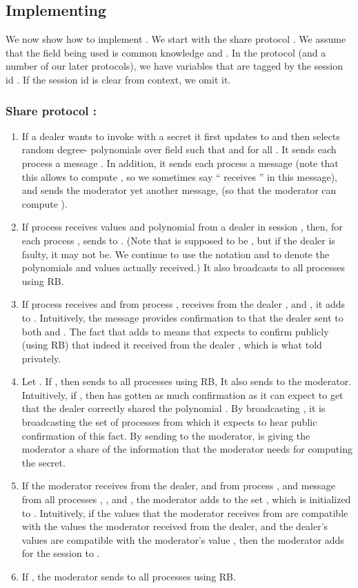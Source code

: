 \documentclass{sig-alternate}
\newcommand{\mwdavss}{\text{MW-SVSS}\xspace}
\begin{document}
\subsection{Implementing \mwdavss}
We now show how to implement \mwdavss.  We start with the
share protocol .  We assume that the field  being used is
common knowledge and .
In the  protocol (and a number of our later protocols), we
have variables that are tagged by the session id .  If the
session id is clear from context, we omit it.

\subsubsection*{Share protocol :}
\begin{enumerate}
\item If a dealer  wants to invoke  with a
secret  it first updates  to  and then
selects  random degree-
polynomials  over field  such
that  and  for all
.
It sends each process  a message
 .
In addition, it sends each process  a message
 (note that this allows  to
compute , so we sometimes say `` receives '' in
this message),
and sends the moderator yet another message,
 (so that the moderator can compute ).

\item If process  receives values 
and polynomial  from a dealer  in session ,
then, for each process ,  sends
 to .
(Note that  is supposed to be , but if the dealer
is faulty, it may not be.  We continue to use the notation  and
 to denote the polynomials and values actually received.)
It also broadcasts  to all processes using RB.

\item If process  receives   and
 from process , receives 
from the dealer , and , it
adds  to .
Intuitively, the message  provides
confirmation to  that
the dealer sent  to both  and .  The fact that
 adds  to  means that 
expects  to confirm publicly (using RB) that indeed it received
 from the dealer , which is what  told 
privately.

\item Let .
If ,
then   sends  to all processes using RB,
It also sends  to the moderator.  Intuitively, if , then  has gotten as much confirmation as it can expect
to get that the dealer  correctly shared the polynomial
.  By broadcasting , it is broadcasting the set of processes
from which it
expects to hear public  confirmation of this fact.  By sending
 to the moderator,  is giving the moderator a
share of the information that the moderator needs
for computing the secret.
\item If the moderator receives  from the dealer,
 and  from process , and
 message from all processes ,
, and , the moderator
adds  to the set ,
which is initialized to .
Intuitively, if the values that the
moderator receives from  are compatible with the values the
moderator received from the dealer, and the dealer's values are
compatible with the moderator's value ,
then the moderator adds  for the session  to .
\item
If
, the
moderator sends  to all processes using RB.


\end{enumerate}
\end{document}
